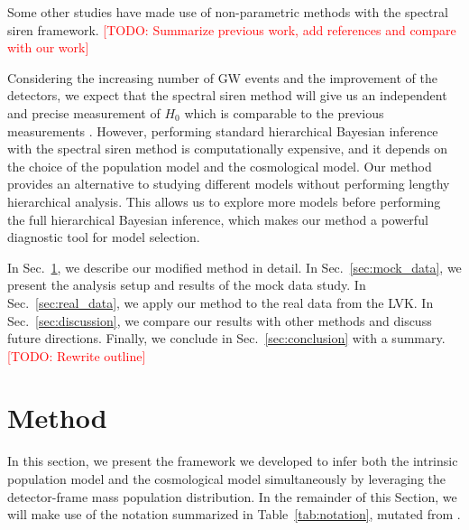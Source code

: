 \documentclass[twocolumn]{aastex631}
\newcommand{\todo}[1]{\textcolor{red}{[TODO: #1]}}
\begin{document}
Some other studies have made use of non-parametric methods with the spectral siren framework.
\todo{Summarize previous work, add references and compare with our work}

Considering the increasing number of \ac{GW} events and the improvement of the detectors, we expect that the spectral siren method will give us an independent and precise measurement of $H_0$ which is comparable to the previous measurements \citep{Planck:2018vyg, Riess:2021jrx}.
However, performing standard hierarchical Bayesian inference with the spectral siren method is computationally expensive, and it depends on the choice of the population model and the cosmological model.
Our method provides an alternative to studying different models without performing lengthy hierarchical analysis.
This allows us to explore more models before performing the full hierarchical Bayesian inference, which makes our method a powerful diagnostic tool for model selection.

In Sec.~\ref{sec:method}, we describe our modified method in detail.
In Sec.~\ref{sec:mock_data}, we present the analysis setup and results of the mock data study.
In Sec.~\ref{sec:real_data}, we apply our method to the real data from the \ac{LVK}.
In Sec.~\ref{sec:discussion}, we compare our results with other methods and discuss future directions.
Finally, we conclude in Sec.~\ref{sec:conclusion} with a summary.
\todo{Rewrite outline}

\section{Method}
\label{sec:method}

In this section, we present the framework we developed to infer both the intrinsic population model and the cosmological model simultaneously by leveraging the detector-frame mass population distribution.
In the remainder of this Section, we will make use of the notation summarized in Table~\ref{tab:notation}, mutated from \citet{Rinaldi:2021bhm, Rinaldi:2022kyg}.
\end{document}
